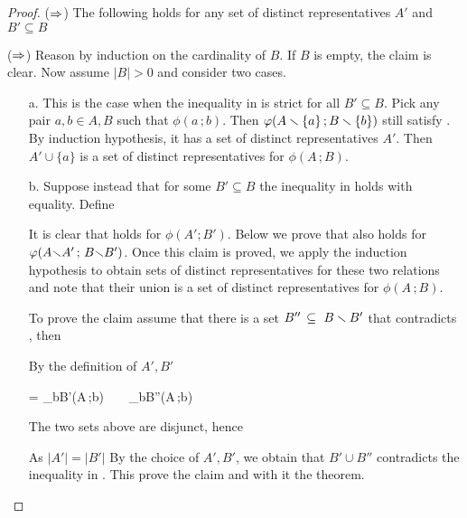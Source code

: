 \documentclass[scombinatorics.tex]{subfiles}
\begin{document}
\begin{proof}
   ($\Rightarrow$)
   The following holds for any set of distinct representatives $A'$ and $B'\subseteq B$  


   ($\Rightarrow$)
   Reason by induction on the cardinality of $B$.
   If $B$ is empty, the claim is clear.
   Now assume $|B|>0$ and consider two cases.

   \begin{itemize}
   \item[a.]
   This is the case when the inequality in  is strict for all $B'\subseteq B$. 
   Pick any pair $a,b\in A,B$ such that $\phi(a\,;b)$. 
   Then $\varphi(A\smallsetminus\{a\}\,; B\smallsetminus\{b\})$ still satisfy .
   By induction hypothesis, it has a set of distinct representatives $A'$.
   Then $A'\cup\{a\}$ is a set of distinct representatives for $\phi(A\,;B)$.

   
   \item[b.]
   Suppose instead that for some $B'\subseteq B$ the inequality in  holds with equality.
   Define

   
   It is clear that  holds for $\phi(A';B')$.
   Below we prove that  also holds for $\varphi(A{\smallsetminus} A'\,;\,{B\smallsetminus} B')$.
   Once this claim is proved, we apply the induction hypothesis to obtain sets of distinct representatives for these two relations and note that their union is a set of distinct representatives for $\phi(A\,;B)$.

   To prove the claim assume that there is a set $B''\,\subseteq\ B\smallsetminus B'$ that contradicts , then


   By the definition of $A',B'$

   {=}
   {\bigcup_{b\in B'}\phi(A\,;b)\ \ \cup\ \ \bigcup_{b\in B''}\phi(A\,;b)}



   The two sets above are disjunct, hence 


   As $|A'|=|B'|$ By the choice of $A',B'$, we obtain that $B'\cup B''$ contradicts the inequality in .
   This prove the claim and with it the theorem.
   \end{itemize}\vspace*{-4ex}
\end{proof}
\end{document}
